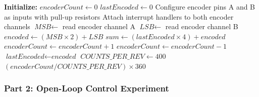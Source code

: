 \begin{algorithm}
\caption{Quadrature Encoder Reading with Interrupts}
\label{alg:encoder}
\begin{algorithmic}[1]
\State \textbf{Initialize:}
\State \hspace{1em} $\textit{encoderCount} \gets 0$
\State \hspace{1em} $\textit{lastEncoded} \gets 0$
\State \hspace{1em} Configure encoder pins A and B as inputs with pull-up resistors
\State \hspace{1em} Attach interrupt handlers to both encoder channels
\State
{} 
    \State $\textit{MSB} \gets$ read encoder channel A
    \State $\textit{LSB} \gets$ read encoder channel B
    \State $\textit{encoded} \gets (\textit{MSB} \times 2) + \textit{LSB}$
    \State $\textit{sum} \gets (\textit{lastEncoded} \times 4) + \textit{encoded}$
        \State $\textit{encoderCount} \gets \textit{encoderCount} + 1$
        \State $\textit{encoderCount} \gets \textit{encoderCount} - 1$
    \EndIf
    \State $\textit{lastEncoded} \gets \textit{encoded}$
\EndProcedure
\State
{}
    \State $\textit{COUNTS\_PER\_REV} \gets 400$ 
    \State \Return $(\textit{encoderCount} / \textit{COUNTS\_PER\_REV}) \times 360$
\EndFunction
\end{algorithmic}
\end{algorithm}

\subsubsection{Part 2: Open-Loop Control Experiment}

